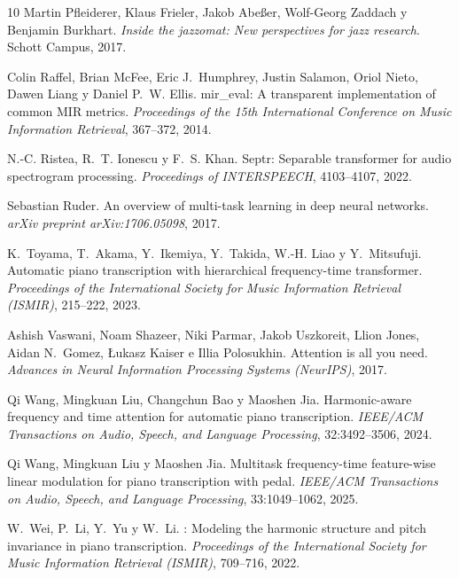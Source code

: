 \documentclass[11pt,spanish,listoffigures,listoftables]{tfgetsinf}
\begin{document}
\begin{thebibliography}{10}
Martin Pfleiderer, Klaus Frieler, Jakob Abe{\ss}er, Wolf-Georg Zaddach y Benjamin Burkhart.
\newblock \textit{Inside the jazzomat: New perspectives for jazz research}.
\newblock Schott Campus, 2017.

Colin Raffel, Brian McFee, Eric J.~Humphrey, Justin Salamon, Oriol Nieto, Dawen Liang y Daniel P.~W. Ellis.
\newblock mir\_eval: A transparent implementation of common {MIR} metrics.
\newblock \textit{Proceedings of the 15th International Conference on Music Information Retrieval}, 367--372, 2014.

N.-C. Ristea, R.~T. Ionescu y F.~S. Khan.
\newblock Septr: Separable transformer for audio spectrogram processing.
\newblock \textit{Proceedings of INTERSPEECH}, 4103--4107, 2022.

Sebastian Ruder.
\newblock An overview of multi-task learning in deep neural networks.
\newblock \textit{arXiv preprint arXiv:1706.05098}, 2017.

K.~Toyama, T.~Akama, Y.~Ikemiya, Y.~Takida, W.-H. Liao y Y.~Mitsufuji.
\newblock Automatic piano transcription with hierarchical frequency-time transformer.
\newblock \textit{Proceedings of the International Society for Music Information Retrieval (ISMIR)}, 215--222, 2023.

Ashish Vaswani, Noam Shazeer, Niki Parmar, Jakob Uszkoreit, Llion Jones, Aidan N.~Gomez, Łukasz Kaiser e Illia Polosukhin.
\newblock Attention is all you need.
\newblock \textit{Advances in Neural Information Processing Systems (NeurIPS)}, 2017.

Qi Wang, Mingkuan Liu, Changchun Bao y Maoshen Jia.
\newblock Harmonic-aware frequency and time attention for automatic piano transcription.
\newblock \textit{IEEE/ACM Transactions on Audio, Speech, and Language Processing}, 32:3492--3506, 2024.

Qi Wang, Mingkuan Liu y Maoshen Jia.
\newblock Multitask frequency-time feature-wise linear modulation for piano transcription with pedal.
\newblock \textit{IEEE/ACM Transactions on Audio, Speech, and Language Processing}, 33:1049--1062, 2025.

W.~Wei, P.~Li, Y.~Yu y W.~Li.
: Modeling the harmonic structure and pitch invariance in piano transcription.
\newblock \textit{Proceedings of the International Society for Music Information Retrieval (ISMIR)}, 709--716, 2022.


\end{thebibliography}
\end{document}
